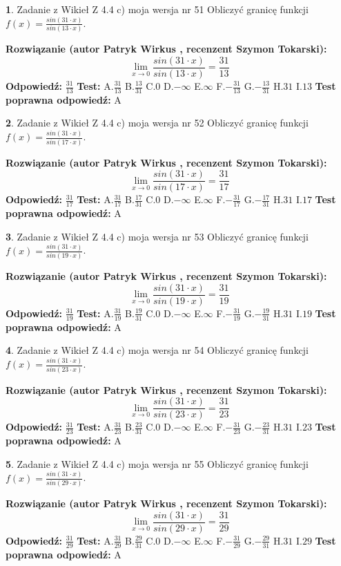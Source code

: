 \documentclass[12pt, a4paper]{article}
\theoremstyle{definition} %
\newtheorem{zad}{}
\newcommand{\zadStart}[1]{\begin{zad}#1\newline}
\newcommand{\zadStop}{\end{zad}}
\newcommand{\rozwStart}[2]{\noindent \textbf{Rozwiązanie (autor #1 , recenzent #2): }\newline}
\newcommand{\rozwStop}{\newline}
\newcommand{\odpStart}{\noindent \textbf{Odpowiedź:}\newline}
\newcommand{\odpStop}{\newline}
\newcommand{\testStart}{\noindent \textbf{Test:}\newline}
\newcommand{\testStop}{\newline}
\newcommand{\kluczStart}{\noindent \textbf{Test poprawna odpowiedź:}\newline}
\newcommand{\kluczStop}{\newline}
\begin{document}
\zadStart{Zadanie z Wikieł Z 4.4 c) moja wersja nr 51}
Obliczyć granicę funkcji $f(x)=\frac{sin(31\cdot x)}{sin(13\cdot x)}$.
\zadStop
\rozwStart{Patryk Wirkus}{Szymon Tokarski}
$$\lim\limits_{x\to 0}\frac{sin(31\cdot x)}{sin(13\cdot x)}=
\frac{31}{13}$$
\rozwStop
\odpStart
$\frac{31}{13}$
\odpStop
\testStart
A.$\frac{31}{13}$
B.$\frac{13}{31}$
C.$0$
D.$-\infty$
E.$\infty$
F.$-\frac{31}{13}$
G.$-\frac{13}{31}$
H.$31$
I.$13$
\testStop
\kluczStart
A
\kluczStop



\zadStart{Zadanie z Wikieł Z 4.4 c) moja wersja nr 52}
Obliczyć granicę funkcji $f(x)=\frac{sin(31\cdot x)}{sin(17\cdot x)}$.
\zadStop
\rozwStart{Patryk Wirkus}{Szymon Tokarski}
$$\lim\limits_{x\to 0}\frac{sin(31\cdot x)}{sin(17\cdot x)}=
\frac{31}{17}$$
\rozwStop
\odpStart
$\frac{31}{17}$
\odpStop
\testStart
A.$\frac{31}{17}$
B.$\frac{17}{31}$
C.$0$
D.$-\infty$
E.$\infty$
F.$-\frac{31}{17}$
G.$-\frac{17}{31}$
H.$31$
I.$17$
\testStop
\kluczStart
A
\kluczStop



\zadStart{Zadanie z Wikieł Z 4.4 c) moja wersja nr 53}
Obliczyć granicę funkcji $f(x)=\frac{sin(31\cdot x)}{sin(19\cdot x)}$.
\zadStop
\rozwStart{Patryk Wirkus}{Szymon Tokarski}
$$\lim\limits_{x\to 0}\frac{sin(31\cdot x)}{sin(19\cdot x)}=
\frac{31}{19}$$
\rozwStop
\odpStart
$\frac{31}{19}$
\odpStop
\testStart
A.$\frac{31}{19}$
B.$\frac{19}{31}$
C.$0$
D.$-\infty$
E.$\infty$
F.$-\frac{31}{19}$
G.$-\frac{19}{31}$
H.$31$
I.$19$
\testStop
\kluczStart
A
\kluczStop



\zadStart{Zadanie z Wikieł Z 4.4 c) moja wersja nr 54}
Obliczyć granicę funkcji $f(x)=\frac{sin(31\cdot x)}{sin(23\cdot x)}$.
\zadStop
\rozwStart{Patryk Wirkus}{Szymon Tokarski}
$$\lim\limits_{x\to 0}\frac{sin(31\cdot x)}{sin(23\cdot x)}=
\frac{31}{23}$$
\rozwStop
\odpStart
$\frac{31}{23}$
\odpStop
\testStart
A.$\frac{31}{23}$
B.$\frac{23}{31}$
C.$0$
D.$-\infty$
E.$\infty$
F.$-\frac{31}{23}$
G.$-\frac{23}{31}$
H.$31$
I.$23$
\testStop
\kluczStart
A
\kluczStop



\zadStart{Zadanie z Wikieł Z 4.4 c) moja wersja nr 55}
Obliczyć granicę funkcji $f(x)=\frac{sin(31\cdot x)}{sin(29\cdot x)}$.
\zadStop
\rozwStart{Patryk Wirkus}{Szymon Tokarski}
$$\lim\limits_{x\to 0}\frac{sin(31\cdot x)}{sin(29\cdot x)}=
\frac{31}{29}$$
\rozwStop
\odpStart
$\frac{31}{29}$
\odpStop
\testStart
A.$\frac{31}{29}$
B.$\frac{29}{31}$
C.$0$
D.$-\infty$
E.$\infty$
F.$-\frac{31}{29}$
G.$-\frac{29}{31}$
H.$31$
I.$29$
\testStop
\kluczStart
A
\kluczStop
\end{document}
